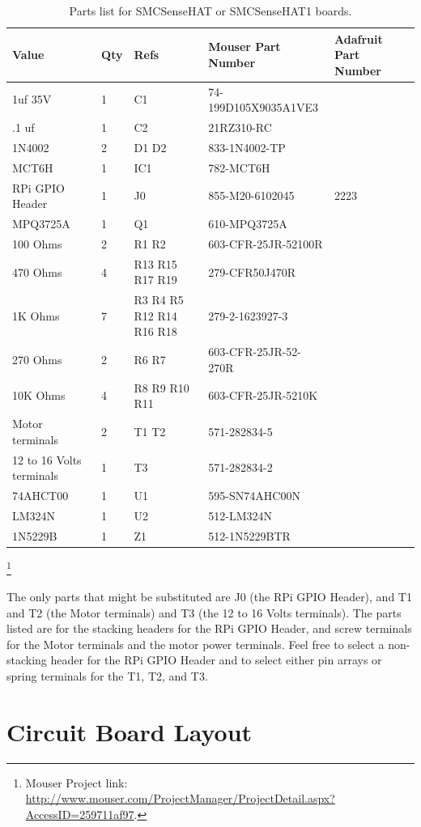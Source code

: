 \begin{table}[htp]
\begin{centering}\begin{tabular}{|l|l|p{1in}|l|p{.5in}|}
\hline
Value&Qty&Refs&Mouser Part Number&Adafruit Part Number \\
\hline
1uf 35V&1&C1&74-199D105X9035A1VE3& \\
\hline
.1 uf&1&C2&21RZ310-RC& \\
\hline
1N4002&2&D1 D2&833-1N4002-TP& \\
\hline
MCT6H&1&IC1&782-MCT6H& \\
\hline
RPi GPIO Header&1&J0&855-M20-6102045&2223 \\
\hline
MPQ3725A&1&Q1&610-MPQ3725A& \\
\hline
100 Ohms&2&R1 R2&603-CFR-25JR-52100R& \\
\hline
470 Ohms&4&R13 R15 R17 R19&279-CFR50J470R& \\
\hline
1K Ohms&7&R3 R4 R5 R12 R14 R16 R18&279-2-1623927-3& \\
\hline
270 Ohms&2&R6 R7&603-CFR-25JR-52-270R& \\
\hline
10K Ohms&4&R8 R9 R10 R11&603-CFR-25JR-5210K& \\
\hline
Motor terminals&2&T1 T2&571-282834-5& \\
\hline
12 to 16 Volts terminals&1&T3&571-282834-2& \\
\hline
74AHCT00&1&U1&595-SN74AHC00N& \\
\hline
LM324N&1&U2&512-LM324N& \\
\hline
1N5229B&1&Z1&512-1N5229BTR& \\
\hline
\end{tabular}
\caption{Parts list for SMCSenseHAT or SMCSenseHAT1 boards.}
\end{centering}\end{table}\footnote{Mouser Project link: 
\url{http://www.mouser.com/ProjectManager/ProjectDetail.aspx?AccessID=259711af97}.}


The only parts that might be substituted are J0 (the RPi GPIO Header), and T1 
and T2 (the Motor terminals) and T3 (the 12 to 16 Volts terminals).  The parts 
listed are for the stacking headers for the RPi GPIO Header, and screw 
terminals for the Motor terminals and the motor power terminals.  Feel free to 
select a non-stacking header for the RPi GPIO Header and to select either pin 
arrays or spring terminals for the T1, T2, and T3.


\section{Circuit Board Layout}

